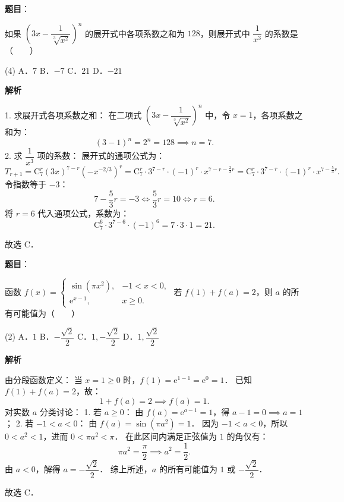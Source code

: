 \begin{answer}

\textbf{题目}：

如果 $\left(3x - \dfrac{1}{\sqrt[3]{x^2}}\right)^n$ 的展开式中各项系数之和为 $128$，则展开式中 $\dfrac{1}{x^3}$ 的系数是\mbox{（　　）}

\begin{gkopts}(4)
\task A．$7$
\task B．$-7$
\task C．$21$
\task D．$-21$
\end{gkopts}

\textbf{解析}

1. 求展开式各项系数之和：
在二项式 $\left(3x - \dfrac{1}{\sqrt[3]{x^2}}\right)^n$ 中，令 $x = 1$，各项系数之和为：
\nopagebreak[4]
\[
(3 - 1)^n = 2^n = 128 \implies n = 7.
\]
2. 求 $\dfrac{1}{x^3}$ 项的系数：
展开式的通项公式为：
\nopagebreak[4]
\[
T_{r+1} = \mathrm{C}_7^r (3x)^{7-r} \left(-x^{-2/3}\right)^r = \mathrm{C}_7^r \cdot 3^{7-r} \cdot (-1)^r \cdot x^{7 - r - \frac{2}{3}r} = \mathrm{C}_7^r \cdot 3^{7-r} \cdot (-1)^r \cdot x^{7 - \frac{5}{3}r}.
\]
令指数等于 $-3$：
\nopagebreak[4]
\[
7 - \dfrac{5}{3}r = -3 \iff \dfrac{5}{3}r = 10 \iff r = 6.
\]
将 $r = 6$ 代入通项公式，系数为：
\nopagebreak[4]
\[
\mathrm{C}_7^6 \cdot 3^{7-6} \cdot (-1)^6 = 7 \cdot 3 \cdot 1 = 21.
\]

故选 C．


\end{answer}
\begin{answer}

\textbf{题目}：

函数 $f(x) = \begin{cases} \sin(\pi x^2), & -1 < x < 0, \\ \mathrm{e}^{x-1}, & x \geqslant 0. \end{cases}$ 若 $f(1) + f(a) = 2$，则 $a$ 的所有可能值为\mbox{（　　）}

\begin{gkopts}(2)
\task A．$1$
\task B．$-\dfrac{\sqrt{2}}{2}$
\task C．$1, -\dfrac{\sqrt{2}}{2}$
\task D．$1, \dfrac{\sqrt{2}}{2}$
\end{gkopts}

\textbf{解析}

由分段函数定义：
当 $x = 1 \geqslant 0$ 时，$f(1) = \mathrm{e}^{1-1} = \mathrm{e}^0 = 1$．
已知 $f(1) + f(a) = 2$，故：
\nopagebreak[4]
\[
1 + f(a) = 2 \implies f(a) = 1.
\]
对实数 $a$ 分类讨论：
1. 若 $a \geqslant 0$：
由 $f(a) = \mathrm{e}^{a-1} = 1$，得 $a - 1 = 0 \implies a = 1$；
2. 若 $-1 < a < 0$：
由 $f(a) = \sin(\pi a^2) = 1$．
因为 $-1 < a < 0$，所以 $0 < a^2 < 1$，进而 $0 < \pi a^2 < \pi$．
在此区间内满足正弦值为 $1$ 的角仅有：
\nopagebreak[4]
\[
\pi a^2 = \dfrac{\pi}{2} \implies a^2 = \dfrac{1}{2}.
\]
由 $a < 0$，解得 $a = -\dfrac{\sqrt{2}}{2}$．
综上所述，$a$ 的所有可能值为 $1$ 或 $-\dfrac{\sqrt{2}}{2}$．

故选 C．


\end{answer}
